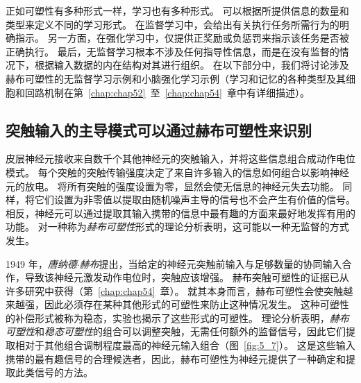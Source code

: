 正如可塑性有多种形式一样，学习也有多种形式。
可以根据所提供信息的数量和类型来定义不同的学习形式。
在监督学习中，会给出有关执行任务所需行为的明确指示。
另一方面，在强化学习中，仅提供正奖励或负惩罚来指示该任务是否被正确执行。
最后，无监督学习根本不涉及任何指导性信息，而是在没有监督的情况下，根据输入数据的内在结构对其进行组织。
在以下部分中，我们将讨论涉及赫布可塑性的无监督学习示例和小脑强化学习示例（学习和记忆的各种类型及其细胞和回路机制在第~\ref{chap:chap52}~至~\ref{chap:chap54}~章中有详细描述）。



\subsection{突触输入的主导模式可以通过赫布可塑性来识别}

皮层神经元接收来自数千个其他神经元的突触输入，并将这些信息组合成动作电位模式。
每个突触的突触传输强度决定了来自许多输入的信息如何组合以影响神经元的放电。
将所有突触的强度设置为零，显然会使无信息的神经元失去功能。
同样，将它们设置为非零值以提取由随机噪声主导的信号也不会产生有价值的信号。
相反，神经元可以通过提取其输入携带的信息中最有趣的方面来最好地发挥有用的功能。
对一种称为\textit{赫布可塑性}形式的理论分析表明，这可能以一种无监督的方式发生。


1949 年，\textit{唐纳德$\cdot$赫布}提出，当给定的神经元突触前输入与足够数量的协同输入合作，导致该神经元激发动作电位时，突触应该增强。
赫布突触可塑性的证据已从许多研究中获得（第~\ref{chap:chap54}~章）。 
就其本身而言，赫布可塑性会使突触越来越强，因此必须存在某种其他形式的可塑性来防止这种情况发生。 
这种可塑性的补偿形式被称为稳态，实验也揭示了这些形式的可塑性。 
理论分析表明，\textit{赫布可塑性}和\textit{稳态可塑性}的组合可以调整突触，无需任何额外的监督信号，因此它们提取相对于其他组合调制程度最高的神经元输入组合（图~\ref{fig:5_7}）。 
这是这些输入携带的最有趣信号的合理候选者，因此，赫布可塑性为神经元提供了一种确定和提取此类信号的方法。


